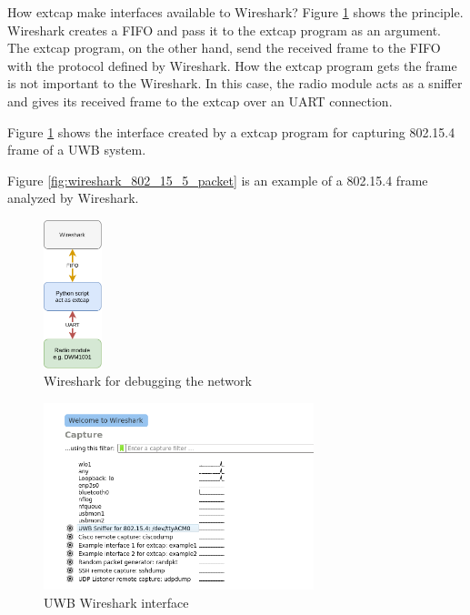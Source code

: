 \documentclass[\main/main.tex]{subfiles}
\begin{document}
How extcap make interfaces available to Wireshark? Figure \ref{fig:extcap_802_15_4} shows the principle. Wireshark creates a FIFO and pass it to the extcap program as an argument. The extcap program, on the other hand, send the received frame to the FIFO with the protocol defined by Wireshark. How the extcap program gets the frame is not important to the Wireshark. In this case, the radio module acts as a sniffer and gives its received frame to the extcap over an UART connection.

Figure \ref{fig:extcap_802_15_4} shows the interface created by a extcap program for capturing 802.15.4 frame of a UWB system.

Figure \ref{fig:wireshark_802_15_5_packet} is an example of a 802.15.4 frame analyzed by Wireshark.

\begin{figure}[H]
    \begin{center}
        \includegraphics[width=0.15\textwidth]{extcap_802_15_4.png}
    \end{center}
    \caption{Wireshark for debugging the network}
    \label{fig:extcap_802_15_4}
\end{figure}

\begin{figure}[H]
    \begin{center}
        \includegraphics[width=0.7\textwidth]{wireshark_interface.png}
    \end{center}
    \caption{UWB Wireshark interface}
    \label{fig:wireshark_interface}
\end{figure}
\end{document}
